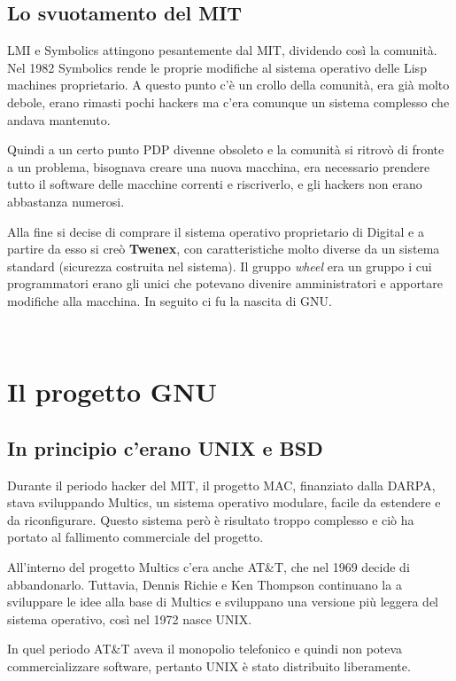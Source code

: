  \subsection{Lo svuotamento del MIT}
 
LMI e Symbolics attingono pesantemente dal MIT, dividendo così la comunità. 
Nel 1982 Symbolics rende le proprie modifiche al sistema operativo delle Lisp machines proprietario. A questo punto c'è un crollo della comunità, era già molto debole, erano rimasti pochi hackers ma c'era comunque un sistema complesso che andava mantenuto. 
 
Quindi a un certo punto PDP divenne obsoleto e la comunità si ritrovò di fronte a un problema, bisognava creare una nuova macchina, era necessario prendere tutto il software delle macchine correnti e riscriverlo, e gli hackers non erano abbastanza numerosi. 
 
Alla fine si decise di comprare il sistema operativo proprietario di Digital e a partire da esso si creò \textbf{Twenex}, con caratteristiche molto diverse da un sistema standard (sicurezza costruita nel sistema). 
Il gruppo \textit{wheel} era un gruppo i cui programmatori erano gli unici che potevano divenire amministratori e apportare modifiche alla macchina. In seguito ci fu la nascita di GNU.

\
\section{Il progetto GNU}

\subsection{In principio c'erano UNIX e BSD}

Durante il periodo hacker del MIT, il progetto MAC, finanziato dalla DARPA, stava sviluppando Multics, un sistema operativo modulare, facile da estendere e da riconfigurare.
Questo sistema però è risultato troppo complesso e ciò ha portato al fallimento commerciale del progetto.

All'interno del progetto Multics c'era anche AT\&T, che nel 1969 decide di abbandonarlo. Tuttavia, Dennis Richie e Ken Thompson continuano la a sviluppare le idee alla base di Multics e sviluppano una versione più leggera del sistema operativo, così nel 1972 nasce UNIX.

In quel periodo AT\&T aveva il monopolio telefonico e quindi non poteva commercializzare software, pertanto UNIX è stato distribuito liberamente.

